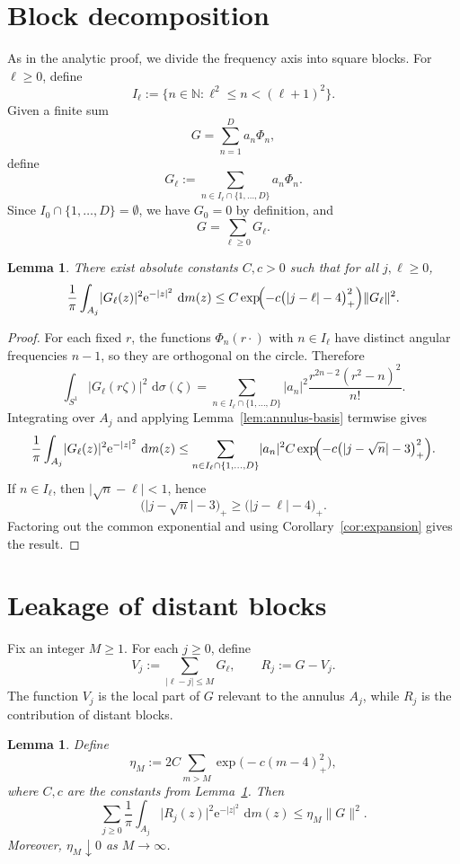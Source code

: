 \documentclass[11pt]{amsart}
\newtheorem{lemma}[theorem]{Lemma}
\theoremstyle{remark}
\newcommand{\N}{\mathbb{N}}
\newcommand{\abs}[1]{\lvert #1 \rvert}
\newcommand{\norm}[1]{\lVert #1 \rVert}
\newcommand{\dd}{\,\mathrm{d}}
\newcommand{\ee}{\mathrm{e}}
\begin{document}
\section{Block decomposition}

As in the analytic proof, we divide the frequency axis into square blocks. For
$\ell \ge 0$, define
\[
I_\ell := \{n \in \N : \ell^2 \le n < (\ell+1)^2\}.
\]
Given a finite sum
\[
G = \sum_{n=1}^D a_n \Phi_n,
\]
define
\[
G_\ell := \sum_{n \in I_\ell \cap \{1,\dots,D\}} a_n \Phi_n.
\]
Since $I_0 \cap \{1,\dots,D\} = \emptyset$, we have $G_0=0$ by definition,
and
\[
G = \sum_{\ell \ge 0} G_\ell.
\]

\begin{lemma}\label{lem:block-annulus}
There exist absolute constants $C,c>0$ such that for all $j,\ell \ge 0$,
\[
\frac1\pi \int_{A_j} \abs{G_\ell(z)}^2 \ee^{-\abs{z}^2}\,\dd m(z)
\le
C \exp\!\Bigl(-c\bigl(\abs{j-\ell}-4\bigr)_+^2\Bigr)\norm{G_\ell}^2.
\]
\end{lemma}

\begin{proof}
For each fixed $r$, the functions $\Phi_n(r\cdot)$ with $n \in I_\ell$ have
distinct angular frequencies $n-1$, so they are orthogonal on the circle.
Therefore
\[
\int_{S^1} \abs{G_\ell(r\zeta)}^2\,\dd \sigma(\zeta)
=
\sum_{n \in I_\ell \cap \{1,\dots,D\}}
\abs{a_n}^2 \frac{r^{2n-2}(r^2-n)^2}{n!}.
\]
Integrating over $A_j$ and applying Lemma~\ref{lem:annulus-basis} termwise
gives
\[
\frac1\pi \int_{A_j} \abs{G_\ell(z)}^2 \ee^{-\abs{z}^2}\,\dd m(z)
\le
\sum_{n \in I_\ell \cap \{1,\dots,D\}}
\abs{a_n}^2 C \exp\!\Bigl(-c\bigl(\abs{j-\sqrt n}-3\bigr)_+^2\Bigr).
\]
If $n \in I_\ell$, then $\abs{\sqrt n - \ell}<1$, hence
\[
\bigl(\abs{j-\sqrt n}-3\bigr)_+
\ge
\bigl(\abs{j-\ell}-4\bigr)_+.
\]
Factoring out the common exponential and using
Corollary~\ref{cor:expansion} gives the result.
\end{proof}

\section{Leakage of distant blocks}

Fix an integer $M \ge 1$. For each $j \ge 0$, define
\[
V_j := \sum_{\abs{\ell-j}\le M} G_\ell,
\qquad
R_j := G - V_j.
\]
The function $V_j$ is the local part of $G$ relevant to the annulus $A_j$,
while $R_j$ is the contribution of distant blocks.

\begin{lemma}\label{lem:leakage}
Define
\[
\eta_M
:=
2C \sum_{m>M} \exp\!\bigl(-c(m-4)_+^2\bigr),
\]
where $C,c$ are the constants from Lemma~\ref{lem:block-annulus}. Then
\[
\sum_{j\ge0}
\frac1\pi \int_{A_j} \abs{R_j(z)}^2 \ee^{-\abs{z}^2}\,\dd m(z)
\le
\eta_M \norm{G}^2.
\]
Moreover, $\eta_M \downarrow 0$ as $M \to \infty$.
\end{lemma}
\end{document}
